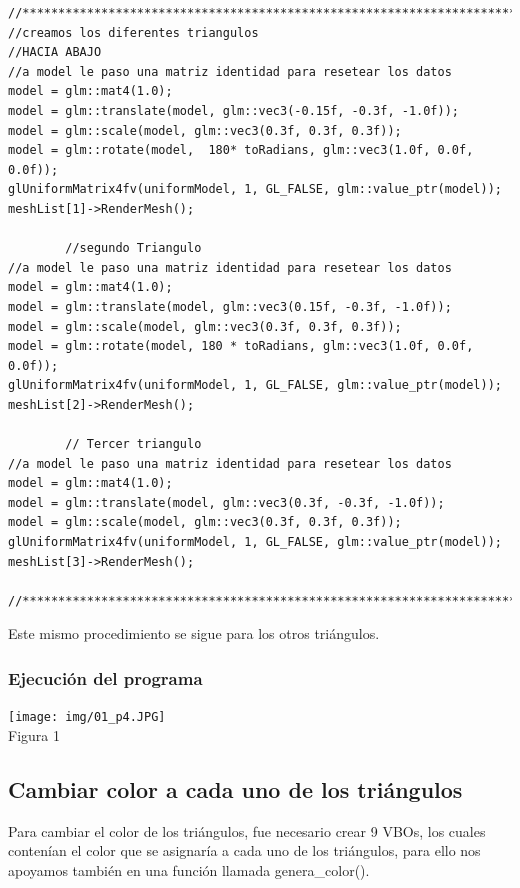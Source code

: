 \documentclass[12pt, a4paper]{article}
\begin{document}
	\begin{verbatim}
//************************************************************************
//creamos los diferentes triangulos 
//HACIA ABAJO
//a model le paso una matriz identidad para resetear los datos 
model = glm::mat4(1.0);
model = glm::translate(model, glm::vec3(-0.15f, -0.3f, -1.0f));
model = glm::scale(model, glm::vec3(0.3f, 0.3f, 0.3f));
model = glm::rotate(model,  180* toRadians, glm::vec3(1.0f, 0.0f, 0.0f));
glUniformMatrix4fv(uniformModel, 1, GL_FALSE, glm::value_ptr(model));
meshList[1]->RenderMesh();

		//segundo Triangulo
//a model le paso una matriz identidad para resetear los datos 
model = glm::mat4(1.0);
model = glm::translate(model, glm::vec3(0.15f, -0.3f, -1.0f));
model = glm::scale(model, glm::vec3(0.3f, 0.3f, 0.3f));
model = glm::rotate(model, 180 * toRadians, glm::vec3(1.0f, 0.0f, 0.0f));
glUniformMatrix4fv(uniformModel, 1, GL_FALSE, glm::value_ptr(model));
meshList[2]->RenderMesh();

		// Tercer triangulo
//a model le paso una matriz identidad para resetear los datos 
model = glm::mat4(1.0);
model = glm::translate(model, glm::vec3(0.3f, -0.3f, -1.0f));
model = glm::scale(model, glm::vec3(0.3f, 0.3f, 0.3f));
glUniformMatrix4fv(uniformModel, 1, GL_FALSE, glm::value_ptr(model));
meshList[3]->RenderMesh();

//************************************************************************
	\end{verbatim}
	
\vspace{.1cm}	
\justify
Este mismo procedimiento se sigue para los otros triángulos.

\subsubsection{Ejecución del programa}
	\centering 
	\texttt{[image: img/01\_p4.JPG]}\\[.25cm] %
	Figura 1 \\[.55cm]
	\vspace{0.4 cm}
	
	
\raggedright	
\subsection{Cambiar color a cada uno de los triángulos}
\justify
Para cambiar el color de los triángulos, fue necesario crear 9 VBOs, los cuales contenían el color que se asignaría a cada uno de los triángulos, para ello nos apoyamos también en una función llamada genera\_color().\\[.02cm]
\end{document}
